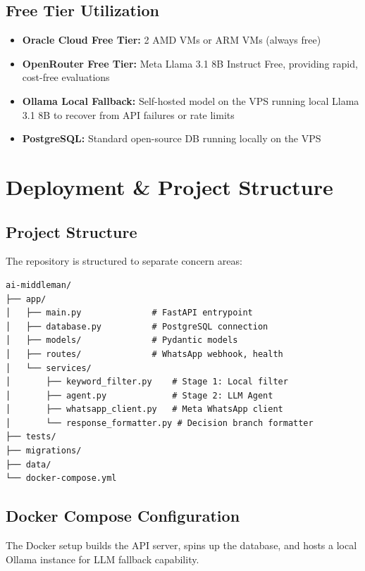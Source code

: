 \documentclass[12pt, a4paper]{report}
\begin{document}
\section{Free Tier Utilization}

\begin{itemize}
    \item \textbf{Oracle Cloud Free Tier:} 2 AMD VMs or ARM VMs (always free)
    \item \textbf{OpenRouter Free Tier:} Meta Llama 3.1 8B Instruct Free, providing rapid, cost-free evaluations
    \item \textbf{Ollama Local Fallback:} Self-hosted model on the VPS running local Llama 3.1 8B to recover from API failures or rate limits
    \item \textbf{PostgreSQL:} Standard open-source DB running locally on the VPS
\end{itemize}

\chapter{Deployment \& Project Structure}

\section{Project Structure}

The repository is structured to separate concern areas:

\begin{lstlisting}[caption=Project Directory Structure]
ai-middleman/
├── app/
│   ├── main.py              # FastAPI entrypoint
│   ├── database.py          # PostgreSQL connection
│   ├── models/              # Pydantic models
│   ├── routes/              # WhatsApp webhook, health
│   └── services/
│       ├── keyword_filter.py    # Stage 1: Local filter
│       ├── agent.py             # Stage 2: LLM Agent
│       ├── whatsapp_client.py   # Meta WhatsApp client
│       └── response_formatter.py # Decision branch formatter
├── tests/
├── migrations/
├── data/
└── docker-compose.yml
\end{lstlisting}

\section{Docker Compose Configuration}

The Docker setup builds the API server, spins up the database, and hosts a local Ollama instance for LLM fallback capability.
\end{document}
